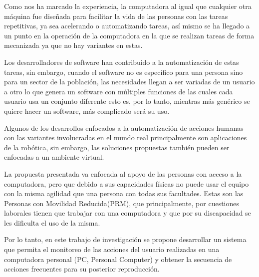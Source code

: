 
Como nos ha marcado la experiencia, la computadora al igual que cualquier otra
 máquina fue diseñada para facilitar la vida de las personas con las tareas
 repetitivas, ya sea acelerando o automatizando tareas, así mismo se ha llegado
 a un punto en la operación de la computadora en la que se realizan tareas de
 forma mecanizada ya que no hay variantes en estas.  

Los desarrolladores de software han contribuido a la automatización de estas
 tareas, sin embargo, cuando el software no es específico para una persona
 sino para un sector de la población, las necesidades llegan a ser variadas
 de un usuario a otro lo que genera un software con múltiples funciones de las
 cuales cada usuario usa un conjunto diferente esto es, por lo tanto,
 mientras más genérico se quiere hacer un software, más complicado será su
 uso. 

Algunos de los desarrollos enfocados a la automatización de acciones humanas
 con las variantes involucradas en el mundo real principalmente son 
 aplicaciones de la robótica, sin embargo, las soluciones propuestas también
 pueden ser enfocadas a un ambiente virtual.

La propuesta presentada va enfocada al apoyo de las personas con acceso a la
 computadora, pero que debido a sus capacidades físicas no puede usar el equipo
 con la misma agilidad que una persona con todas sus facultades. Estas son las
 Personas con Movilidad Reducida(PRM), que principalmente, por cuestiones
 laborales tienen que trabajar con una computadora y que por su discapacidad se
 les dificulta el uso de la misma.

Por lo tanto, en este trabajo de investigación se propone desarrollar un sistema
 que permita el monitoreo de las acciones del usuario realizadas en una
 computadora personal (PC, Personal Computer) y obtener la secuencia de acciones
 frecuentes para su posterior reproducción.